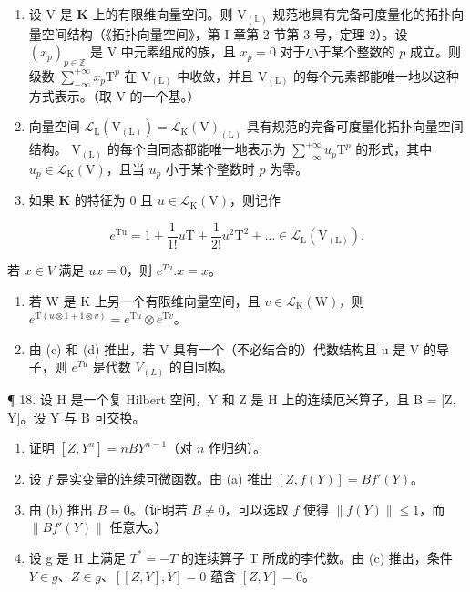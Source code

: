 \begin{enumerate}
\def\labelenumi{(\alph{enumi})}
\item
  设 \(\mathrm{V}\) 是 \(\mathbf{K}\) 上的有限维向量空间。则 \(\mathrm{V}_{(\mathbb{L})}\) 规范地具有完备可度量化的拓扑向量空间结构（《拓扑向量空间》，第 I 章第 2 节第 3 号，定理 2）。设 \((x_{p})_{p\in \mathbb{Z}}\) 是 \(\mathrm{V}\) 中元素组成的族，且 \(x_{p} = 0\) 对于小于某个整数的 \(p\) 成立。则级数 \(\sum_{-\infty}^{+\infty}x_p\mathrm{T}^p\) 在 \(\mathrm{V}_{(\mathrm{L})}\) 中收敛，并且 \(\mathrm{V}_{(\mathrm{L})}\) 的每个元素都能唯一地以这种方式表示。（取 V 的一个基。）
\item
  向量空间 \(\mathcal{L}_{\mathrm{L}}(\mathrm{V}_{(\mathrm{L})}) = \mathcal{L}_{\mathrm{K}}(\mathrm{V})_{(\mathrm{L})}\) 具有规范的完备可度量化拓扑向量空间结构。 \(\mathrm{V}_{(\mathrm{L})}\) 的每个自同态都能唯一地表示为 \(\sum_{-\infty}^{+\infty}u_p\mathrm{T}^p\) 的形式，其中 \(u_{p}\in \mathcal{L}_{\mathrm{K}}(\mathrm{V})\)，且当 \(u_{p}\) 小于某个整数时 \(p\) 为零。
\item
  如果 \(\mathbf{K}\) 的特征为 0 且 \(u\in \mathcal{L}_{\mathrm{K}}(\mathrm{V})\)，则记作
\end{enumerate}

\[
e ^ {\mathrm{Tu}} = 1 + \frac {1}{1 !} u \mathrm{T} + \frac {1}{2 !} u ^ {2} \mathrm{T} ^ {2} + \dots \in \mathcal {L} _ {\mathrm{L}} (\mathrm{V} _ {(\mathrm{L})}).
\]

若 \(x \in V\) 满足 \(ux = 0\)，则 \(e^{Tu}.x = x\)。

\begin{enumerate}
\def\labelenumi{(\alph{enumi})}
\setcounter{enumi}{3}
\item
  若 W 是 K 上另一个有限维向量空间，且 \(v \in \mathcal{L}_{\mathrm{K}}(\mathrm{W})\)，则 \(e^{\mathrm{T}(u \otimes 1 + 1 \otimes v)} = e^{\mathrm{T}u} \otimes e^{\mathrm{T}v}\)。
\item
  由 (c) 和 (d) 推出，若 V 具有一个（不必结合的）代数结构且 u 是 V 的导子，则 \(e^{Tu}\) 是代数 \(V_{(L)}\) 的自同构。
\end{enumerate}

¶ 18. 设 H 是一个复 Hilbert 空间，Y 和 Z 是 H 上的连续厄米算子，且 B = {[}Z, Y{]}。设 Y 与 B 可交换。

\begin{enumerate}
\def\labelenumi{(\alph{enumi})}
\item
  证明 \([Z, Y^n] = nBY^{n-1}\)（对 \(n\) 作归纳）。
\item
  设 \(f\) 是实变量的连续可微函数。由 (a) 推出 \([Z, f(Y)] = Bf'(Y)\)。
\item
  由 (b) 推出 \(B = 0\)。（证明若 \(B \neq 0\)，可以选取 \(f\) 使得 \(\| f(Y) \| \leqslant 1\)，而 \(\| Bf'(Y) \|\) 任意大。）
\item
  设 g 是 H 上满足 \(T^{*} = -T\) 的连续算子 T 所成的李代数。由 (c) 推出，条件 \(Y \in g\)、\(Z \in g\)、\([[Z, Y], Y] = 0\) 蕴含 \([Z, Y] = 0\)。
\end{enumerate}

